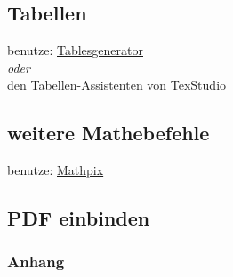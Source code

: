 	\subsection{Tabellen}
		benutze: \href{https://tablesgenerator.com}{Tablesgenerator}\\
		\textit{oder}\\
		den Tabellen-Assistenten von TexStudio\\
		
		
	\subsection{weitere Mathebefehle} 
		benutze: \href{https://mathpix.com}{Mathpix}
		
	\subsection{PDF einbinden}
		\subsubsection{Anhang}
					
	
	